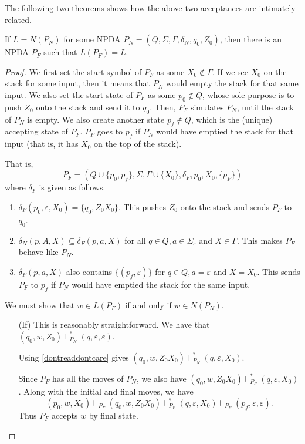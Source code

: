 The following two theorems shows how the above two acceptances are intimately related.

\begin{lemma}
\label{finalifemptystk}
If $L=N(P_N)$ for some NPDA $P_N=(Q,\Sigma,\Gamma,\delta_N,q_0,Z_0)$, then there is an NPDA $P_F$ such that $L(P_F)=L$.
\end{lemma}
\begin{proof}
We first set the start symbol of $P_F$ as some $X_0\not\in\Gamma$. If we see $X_0$ on the stack for some input, then it means that $P_N$ would empty the stack for that same input. We also set the start state of $P_F$ as some $p_0\not\in Q$, whose sole purpose is to push $Z_0$ onto the stack and send it to $q_0$. Then, $P_F$ simulates $P_N$, until the stack of $P_N$ is empty. We also create another state $p_f\not\in Q$, which is the (unique) accepting state of $P_F$. $P_F$ goes to $p_f$ if $P_N$ would have emptied the stack for that input (that is, it has $X_0$ on the top of the stack).

That is, $$P_F=(Q\cup\{p_0,p_f\}, \Sigma, \Gamma\cup\{X_0\}, \delta_F, p_0, X_0, \{p_F\})$$where $\delta_F$ is given as follows.
\begin{enumerate}
    \item $\delta_F(p_0,\varepsilon,X_0)=\{q_0, Z_0X_0\}$. This pushes $Z_0$ onto the stack and sends $P_F$ to $q_0$.
    \item $\delta_N(p,A,X)\subseteq\delta_F(p,a,X)$ for all $q\in Q, a\in\Sigma_\varepsilon$ and $X\in\Gamma$. This makes $P_F$ behave like $P_N$.
    \item $\delta_F(p,a,X)$ also contains $\{(p_f,\varepsilon)\}$ for $q\in Q, a=\varepsilon$ and $X=X_0$. This sends $P_F$ to $p_f$ if $P_N$ would have emptied the stack for the same input.
\end{enumerate}

We must show that $w\in L(P_F)$ if and only if $w\in N(P_N)$.
\begin{itemize}
    \item[(If)] This is reasonably straightforward. We have that $(q_0,w,Z_0)\vdash^*_{P_N}(q,\varepsilon,\varepsilon)$.
    
    Using \ref{dontreaddontcare} gives $(q_0,w,Z_0X_0)\vdash^*_{P_N} (q,\varepsilon,X_0)$.
    
    Since $P_F$ has all the moves of $P_N$, we also have $(q_0,w,Z_0X_0)\vdash^*_{P_F} (q,\varepsilon,X_0)$. Along with the initial and final moves, we have
    $$(p_0,w,X_0)\vdash_{P_F}(q_0,w,Z_0X_0)\vdash^*_{P_F} (q,\varepsilon,X_0)\vdash_{P_F}(p_f,\varepsilon,\varepsilon).$$
    Thus $P_F$ accepts $w$ by final state.
    

\end{itemize}
\end{proof}
